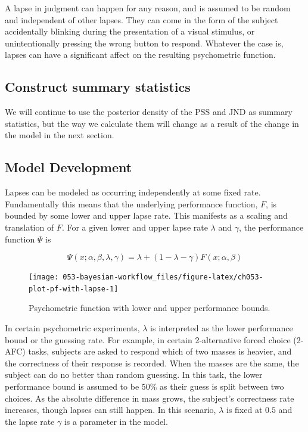 \documentclass[11pt, oneside, openany]{scrbook}
\begin{document}
A lapse in judgment can happen for any reason, and is assumed to be random and independent of other lapses. They can come in the form of the subject accidentally blinking during the presentation of a visual stimulus, or unintentionally pressing the wrong button to respond. Whatever the case is, lapses can have a significant affect on the resulting psychometric function.

\hypertarget{iter4-summary-stats}{%
\subsection{Construct summary statistics}\label{iter4-summary-stats}}

We will continue to use the posterior density of the PSS and JND as summary statistics, but the way we calculate them will change as a result of the change in the model in the next section.

\hypertarget{iter4-model-dev}{%
\subsection{Model Development}\label{iter4-model-dev}}

Lapses can be modeled as occurring independently at some fixed rate. Fundamentally this means that the underlying performance function, \(F\), is bounded by some lower and upper lapse rate. This manifests as a scaling and translation of \(F\). For a given lower and upper lapse rate \(\lambda\) and \(\gamma\), the performance function \(\Psi\) is

\[
\Psi(x; \alpha, \beta, \lambda, \gamma) = \lambda + (1 - \lambda - \gamma) F(x; \alpha, \beta)
\]

\begin{figure}

{\centering \texttt{[image: 053-bayesian-workflow\_files/figure-latex/ch053-plot-pf-with-lapse-1]} 

}

\caption{Psychometric function with lower and upper performance bounds.}\label{fig:ch053-plot-pf-with-lapse}
\end{figure}

In certain psychometric experiments, \(\lambda\) is interpreted as the lower performance bound or the guessing rate. For example, in certain 2-alternative forced choice (2-AFC) tasks, subjects are asked to respond which of two masses is heavier, and the correctness of their response is recorded. When the masses are the same, the subject can do no better than random guessing. In this task, the lower performance bound is assumed to be 50\% as their guess is split between two choices. As the absolute difference in mass grows, the subject's correctness rate increases, though lapses can still happen. In this scenario, \(\lambda\) is fixed at \(0.5\) and the lapse rate \(\gamma\) is a parameter in the model.
\end{document}
